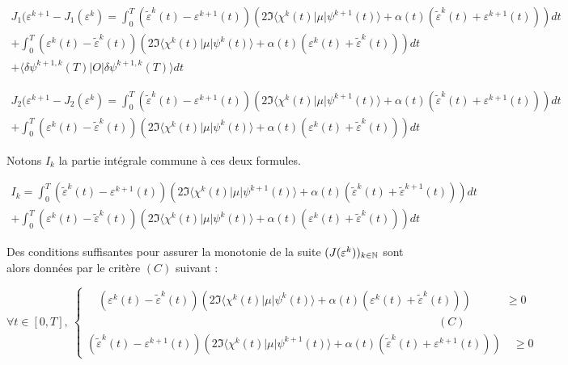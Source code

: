 \begin{equation}
\begin{split}
J_1(\varepsilon^{k+1} - J_1(\varepsilon^k) = \int_0^T (\tilde{\varepsilon}^k(t) - \varepsilon^{k+1}(t))(2\Im\langle \chi^k(t)|\mu|\psi^{k+1}(t)\rangle + \alpha(t)(\tilde{\varepsilon}^k(t) + \varepsilon^{k+1}(t)))dt \\
+ \int_0^T(\varepsilon^k(t) - \tilde{\varepsilon}^k(t))(2\Im\langle \chi^k(t)|\mu|\psi^k(t)\rangle + \alpha(t)(\varepsilon^k(t) + \tilde{\varepsilon}^k(t)))dt \quad\\
+ \langle \delta \psi^{k+1,k}(T)|O|\delta\psi^{k+1,k}(T)\rangle dt \phantom{111111111111111111111111111111}
\end{split}
\end{equation}

\begin{equation}
\begin{split}
J_2(\varepsilon^{k+1} - J_2(\varepsilon^k) = \int_0^T (\tilde{\varepsilon}^k(t) - \varepsilon^{k+1}(t))(2\Im\langle \chi^k(t)|\mu|\psi^{k+1}(t)\rangle + \alpha(t)(\tilde{\varepsilon}^k(t) + \varepsilon^{k+1}(t)))dt \\
+ \int_0^T(\varepsilon^k(t) - \tilde{\varepsilon}^k(t))(2\Im\langle \chi^k(t)|\mu|\psi^k(t)\rangle + \alpha(t)(\varepsilon^k(t) + \tilde{\varepsilon}^k(t)))dt \quad
\end{split}
\end{equation}

Notons $I_k$ la partie intégrale commune à ces deux formules.

\begin{equation}
\begin{split}
I_k = \int_0^T (\tilde{\varepsilon}^k(t) - \varepsilon^{k+1}(t))(2\Im\langle \chi^k(t)|\mu|\psi^{k+1}(t)\rangle + \alpha(t)(\tilde{\varepsilon}^k(t) + \tilde{\varepsilon}^{k+1}(t)))dt \\
+ \int_0^T(\varepsilon^k(t) - \tilde{\varepsilon}^k(t))(2\Im\langle \chi^k(t)|\mu|\psi^k(t)\rangle + \alpha(t)(\varepsilon^k(t) + \tilde{\varepsilon}^k(t)))dt \quad
\end{split}
\end{equation}

Des conditions suffisantes pour assurer la monotonie de la suite $(J(\varepsilon^k))_{k \in \mathbb N}$ sont alors données par le critère $(C)$ suivant :

\begin{equation*}
\forall t \in [0,T],\ 
\begin{cases}
\quad(\varepsilon^k(t) - \tilde{\varepsilon}^k(t))(2\Im\langle \chi^k(t)|\mu|\psi^k(t)\rangle + \alpha(t)(\varepsilon^k(t) + \tilde{\varepsilon}^k(t))) \quad \quad \quad \geq 0\\
\phantom{11111111111111111111111111111111111111111111111111111111}\quad \quad \quad(C) \\
(\tilde{\varepsilon}^k(t) - \varepsilon^{k+1}(t))(2\Im\langle \chi^k(t)|\mu|\psi^{k+1}(t)\rangle + \alpha(t)(\tilde{\varepsilon}^k(t) + \varepsilon^{k+1}(t))) \quad \geq 0
\end{cases}
\end{equation*}

